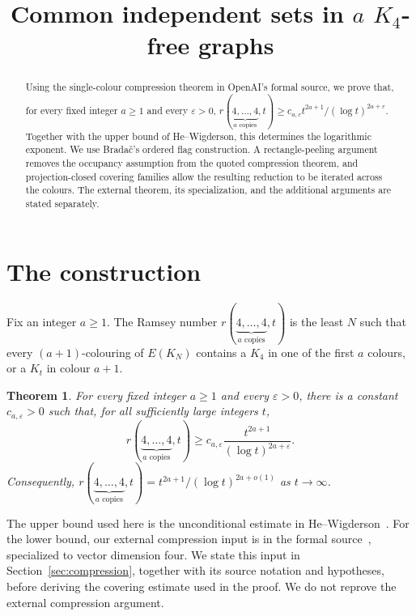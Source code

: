 \documentclass[11pt,a4paper]{article}
\title{Common independent sets in $a$ $K_4$-free graphs}
\author{}
\date{}
\numberwithin{equation}{section}
\newtheorem{theorem}{Theorem}
\newcommand{\eps}{\varepsilon}
\newcommand{\src}[1]{\texttt{\detokenize{#1}}}
\newcommand{\oairoot}{https://github.com/openai/math/blob/adc7f1241b42e322a6451854ab7e4b4c146bf78a/lean/OAI/Combinatorics/SharpRamsey/}
\newcommand{\source}[2]{\href{\oairoot#1}{\src{#2}}}
\begin{document}
\maketitle
\vspace{-2em}

\begin{abstract}
Using the single-colour compression theorem in OpenAI's formal source,
we prove that, for every fixed integer $a\ge1$ and every $\eps>0$,
$r(\underbrace{4,\ldots,4}_{a\text{ copies}},t)
\ge c_{a,\eps}t^{2a+1}/(\log t)^{2a+\eps}$.
Together with the upper bound of He--Wigderson, this determines the
logarithmic exponent. We use Brada\v{c}'s ordered flag construction.
A rectangle-peeling argument removes the occupancy assumption from the
quoted compression theorem, and projection-closed covering families
allow the resulting reduction to be iterated across the colours.
The external theorem, its specialization, and the additional arguments
are stated separately.
\end{abstract}

\section{The construction}

Fix an integer $a\ge1$. The Ramsey number
$r(\underbrace{4,\ldots,4}_{a\text{ copies}},t)$ is the least $N$
such that every $(a+1)$-colouring of $E(K_N)$ contains a $K_4$ in one
of the first $a$ colours, or a $K_t$ in colour $a+1$.

\begin{theorem}\label{thm:main}
For every fixed integer $a\ge1$ and every $\eps>0$, there is a constant
$c_{a,\eps}>0$ such that, for all sufficiently large integers $t$,
\[
 r(\underbrace{4,\ldots,4}_{a\text{ copies}},t)
 \ge c_{a,\eps}\frac{t^{2a+1}}{(\log t)^{2a+\eps}}.
\]
Consequently,
$r(\underbrace{4,\ldots,4}_{a\text{ copies}},t)
=t^{2a+1}/(\log t)^{2a+o(1)}$ as $t\to\infty$.
\end{theorem}

The upper bound used here is the unconditional estimate in
He--Wigderson~\cite[Appendix~B]{HW}.
For the lower bound, our external compression input is
\source{Marking/SelectedStep.lean}{eventually_selected_step}
in the formal source~\cite{OAI}, specialized to vector dimension four.
We state this input in Section~\ref{sec:compression}, together with
its source notation and hypotheses, before deriving the covering
estimate used in the proof. We do not reprove the external compression
argument.
\end{document}
